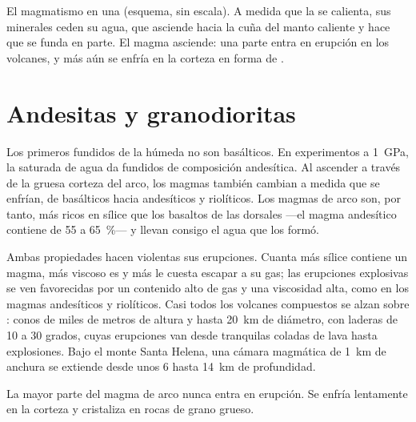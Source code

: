 \begin{omfigure}
{\small El magmatismo en una  (esquema, sin escala). A
medida que la  se calienta, sus minerales ceden su agua, que asciende
hacia la cuña del manto caliente y hace que se funda en parte. El magma
asciende: una parte entra en erupción en los volcanes, y más aún se enfría en
la corteza en forma de .}
\end{omfigure}

\section{Andesitas y granodioritas}

Los primeros fundidos de la  húmeda no son basálticos. En
experimentos a \qty{1}{GPa}, la  saturada de agua da fundidos de
composición andesítica. Al ascender a través de la gruesa corteza del arco,
los magmas también cambian a medida que se enfrían, de basálticos hacia
andesíticos y riolíticos. Los magmas de arco son, por tanto, más ricos en
sílice que los basaltos de las dorsales ---el magma andesítico contiene de 55
a \qty{65}{\percent}--- y llevan consigo el agua que los formó.

Ambas propiedades hacen violentas sus erupciones. Cuanta más sílice contiene
un magma, más viscoso es y más le cuesta escapar a su gas; las erupciones
explosivas se ven favorecidas por un contenido alto de gas y una viscosidad
alta, como en los magmas andesíticos y riolíticos. Casi todos los volcanes
compuestos se alzan sobre : conos de miles de metros de
altura y hasta \qty{20}{km} de diámetro, con laderas de 10 a 30 grados, cuyas
erupciones van desde tranquilas coladas de lava hasta explosiones. Bajo el
monte Santa Helena, una cámara magmática de \qty{1}{km} de anchura se
extiende desde unos 6 hasta \qty{14}{km} de profundidad.

La mayor parte del magma de arco nunca entra en erupción. Se enfría
lentamente en la corteza y cristaliza en rocas de grano grueso.

